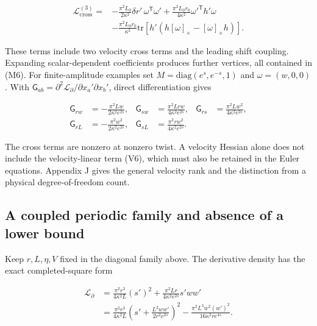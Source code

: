 \begin{equation}\tag{X1}\label{eq:X1}
\begin{aligned}
\mathcal L_{\mathrm{cross}}^{(3)}
={}&-\frac{\pi^2L_0}{2\kappa^2}\delta r'\,\omega^{\mathsf T}\omega'
+\frac{\pi^2L_0r_0}{4\kappa^2}\omega'^{\mathsf T}h'\omega\\
&-\frac{\pi^2L_0r_0}{\kappa^2}
\mathrm{tr}\!\left[h'\left(h[\omega]_\times-[\omega]_\times h\right)\right].
\end{aligned}
\end{equation}

These terms include two velocity cross terms and the leading shift coupling. Expanding scalar-dependent coefficients produces further vertices, all contained in (M6). For finite-amplitude examples set $M=\mathrm{diag}(e^s,e^{-s},1)$ and $\omega=(w,0,0)$. With $\mathsf G_{ab}=\partial^2\mathcal L_\partial/\partial x_a'\partial x_b'$, direct differentiation gives

\begin{equation}\tag{X2}\label{eq:X2}
\begin{aligned}
\mathsf G_{rw}&=-\frac{\pi^2Lw}{2\kappa^2e^{2s}},&
\mathsf G_{sw}&=\frac{\pi^2Lrw}{4\kappa^2e^{2s}},&
\mathsf G_{rs}&=\frac{\pi^2Lw^2}{4\kappa^2e^{2s}},\\
\mathsf G_{rL}&=-\frac{\pi^2w^2}{2\kappa^2e^{2s}},&
\mathsf G_{sL}&=\frac{\pi^2rw^2}{4\kappa^2e^{2s}}.
\end{aligned}
\end{equation}

The cross terms are nonzero at nonzero twist. A velocity Hessian alone does not include the velocity-linear term (V6), which must also be retained in the Euler equations. Appendix J gives the general velocity rank and the distinction from a physical degree-of-freedom count.

\subsection{A coupled periodic family and absence of a lower bound}

Keep $r,L,\eta,V$ fixed in the diagonal family above. The derivative density has the exact completed-square form

\begin{equation}\tag{X3}\label{eq:X3}
\begin{aligned}
\mathcal L_{\partial}
&=\frac{\pi^2r^3}{4\kappa^2L}(s')^2
+\frac{\pi^2Lr}{4\kappa^2e^{2s}}s'ww'\\
&=\frac{\pi^2r^3}{4\kappa^2L}
\left(s'+\frac{L^2ww'}{2r^2e^{2s}}\right)^2
-\frac{\pi^2L^3w^2(w')^2}{16\kappa^2r e^{4s}}.
\end{aligned}
\end{equation}

